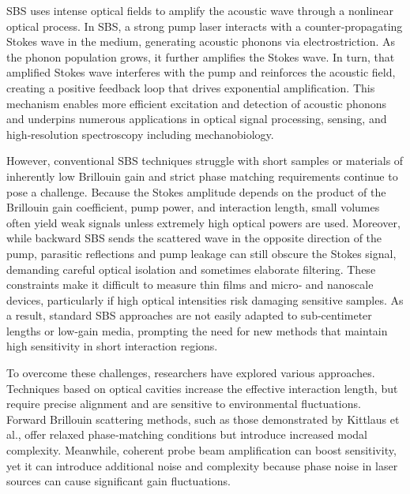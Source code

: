 \ac{SBS} uses intense optical fields to amplify the acoustic wave through a nonlinear optical process. \cite{chiao1964stimulated} In \ac{SBS}, a strong pump laser interacts with a counter‐propagating Stokes wave in the medium, generating acoustic phonons via electrostriction. As the phonon population grows, it further amplifies the Stokes wave. In turn, that amplified Stokes wave interferes with the pump and reinforces the acoustic field, creating a positive feedback loop that drives exponential amplification. This mechanism enables more efficient excitation and detection of acoustic phonons and underpins numerous applications in optical signal processing, sensing, and high‐resolution spectroscopy including mechanobiology. \cite{eggleton2013inducing, fotiadi2023brillouin, kobyakov2009stimulated, ippen1972stimulated, speziale2014brillouin, palombo2019brillouin, dil1982brillouin, eggleton2019brillouin, prevedel2019brillouin, conrad2019mechanical}

However, conventional \ac{SBS} techniques struggle with short samples or materials of inherently low Brillouin gain and strict phase matching requirements continue to pose a challenge. \cite{rakich2012giant, gyger2020observation, yu2024chip} Because the Stokes amplitude depends on the product of the Brillouin gain coefficient, pump power, and interaction length, small volumes often yield weak signals unless extremely high optical powers are used. Moreover, while backward \ac{SBS} sends the scattered wave in the opposite direction of the pump, parasitic reflections and pump leakage can still obscure the Stokes signal, demanding careful optical isolation and sometimes elaborate filtering. These constraints make it difficult to measure thin films and micro‐ and nanoscale devices, particularly if high optical intensities risk damaging sensitive samples. As a result, standard \ac{SBS} approaches are not easily adapted to sub‐centimeter lengths or low‐gain media, prompting the need for new methods that maintain high sensitivity in short interaction regions.

To overcome these challenges, researchers have explored various approaches. \cite{shin2013tailorable, van2015interaction, kittlaus2016large, djadaojee2020stimulated, gusev2018advances, gerakis2011coherent} Techniques based on optical cavities increase the effective interaction length, but require precise alignment and are sensitive to environmental fluctuations. \cite{pant2011cavity} Forward Brillouin scattering methods, such as those demonstrated by Kittlaus et al., \cite{kittlaus2017chip} offer relaxed phase‐matching conditions but introduce increased modal complexity. Meanwhile, coherent probe beam amplification can boost sensitivity, yet it can introduce additional noise and complexity because phase noise in laser sources can cause significant gain fluctuations. \cite{shlomovits2015effect}

